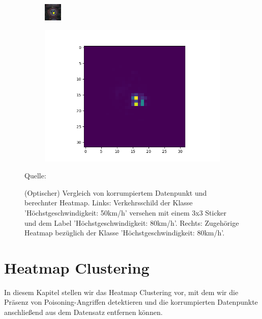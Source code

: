 \documentclass[11pt,a4paper]{article}
\newcommand{\source}[1]{\caption*{\hfill Quelle: {#1}} }
\numberwithin{equation}{section}
\begin{document}
\begin{figure}
	\centering
	\begin{subfigure}{.5\textwidth}
		\centering
		\includegraphics[width=.4\linewidth]{1450_poison}
		
	\end{subfigure}%
	\begin{subfigure}{.5\textwidth}
		\centering
		\includegraphics[width=.7\linewidth]{1450_poison_lrp.png}
		
	\end{subfigure}
	\caption[(Optischer) Vergleich von korrumpiertem Datenpunkt und berechnter Heatmap.]{(Optischer) Vergleich von korrumpiertem Datenpunkt und berechnter Heatmap. Links: Verkehrsschild der Klasse 'Höchstgeschwindigkeit: 50km/h' versehen mit einem 3x3 Sticker und dem Label 'Höchstgeschwindigkeit: 80km/h'. Rechts: Zugehörige Heatmap bezüglich der Klasse 'Höchstgeschwindigkeit: 80km/h'.}
	\source{\cite{AC}}
	
	\label{vergleich_original_lrp}
\end{figure}

\section{Heatmap Clustering} 
In diesem Kapitel stellen wir das Heatmap Clustering vor, mit dem wir die Präsenz von Poisoning-Angriffen detektieren und die korrumpierten Datenpunkte anschließend aus dem Datensatz entfernen können.
\end{document}
